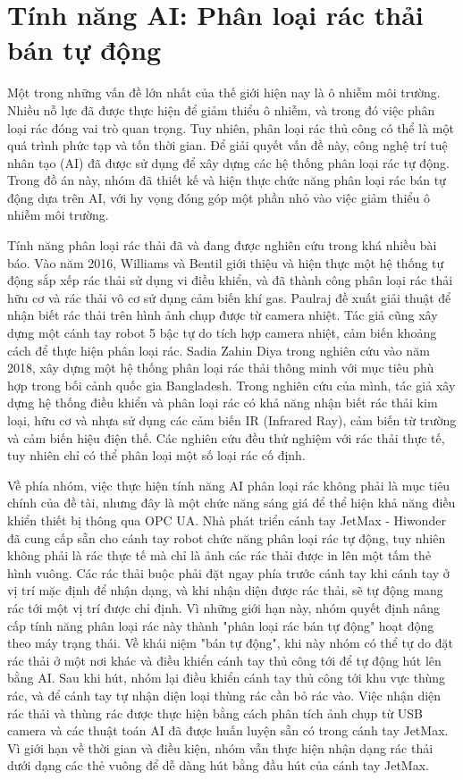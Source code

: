 \newpage

\section{Tính năng AI: Phân loại rác thải bán tự động}

Một trong những vấn đề lớn nhất của thế giới hiện nay là ô nhiễm môi trường. Nhiều nỗ lực đã được thực hiện để giảm thiểu ô nhiễm, và trong đó việc phân loại rác đóng vai trò quan trọng. Tuy nhiên, phân loại rác thủ công có thể là một quá trình phức tạp và tốn thời gian. Để giải quyết vấn đề này, công nghệ trí tuệ nhân tạo (AI) đã được sử dụng để xây dựng các hệ thống phân loại rác tự động. Trong đồ án này, nhóm đã thiết kế và hiện thực chức năng phân loại rác bán tự động dựa trên AI, với hy vọng đóng góp một phần nhỏ vào việc giảm thiểu ô nhiễm môi trường.

Tính năng phân loại rác thải đã và đang được nghiên cứu trong khá nhiều bài báo. Vào năm 2016, Williams và Bentil \cite{williams2016design} giới thiệu và hiện thực một hệ thống tự động sắp xếp rác thải sử dụng vi điều khiển, và đã thành công phân loại rác thải hữu cơ và rác thải vô cơ sử dụng cảm biến khí gas. Paulraj \cite{gundupalli2016automated} đề xuất giải thuật để nhận biết rác thải trên hình ảnh chụp được từ camera nhiệt. Tác giả cũng xây dựng một cánh tay robot 5 bậc tự do tích hợp camera nhiệt, cảm biến khoảng cách để thực hiện phân loại rác. Sadia Zahin Diya \cite{diya2018developing} trong nghiên cứu vào năm 2018, xây dựng một hệ thống phân loại rác thải thông minh với mục tiêu phù hợp trong bối cảnh quốc gia Bangladesh. Trong nghiên cứu của mình, tác giả xây dựng hệ thống điều khiển và phân loại rác có khả năng nhận biết rác thải kim loại, hữu cơ và nhựa sử dụng các cảm biến IR (Infrared Ray), cảm biến từ trường và cảm biến hiệu điện thế. Các nghiên cứu đều thử nghiệm với rác thải thực tế, tuy nhiên chỉ có thể phân loại một số loại rác cố định.


Về phía nhóm, việc thực hiện tính năng AI phân loại rác không phải là mục tiêu chính của đề tài, nhưng đây là một chức năng sáng giá để thể hiện khả năng điều khiển thiết bị thông qua OPC UA. Nhà phát triển cánh tay JetMax - Hiwonder đã cung cấp sẵn cho cánh tay robot chức năng phân loại rác tự động, tuy nhiên không phải là rác thực tế mà chỉ là ảnh các rác thải được in lên một tấm thẻ hình vuông. Các rác thải buộc phải đặt ngay phía trước cánh tay khi cánh tay ở vị trí mặc định để nhận dạng, và khi nhận diện được rác thải, sẽ tự động mang rác tới một vị trí được chỉ định. Vì những giới hạn này, nhóm quyết định nâng cấp tính năng phân loại rác này thành "phân loại rác bán tự động" hoạt động theo máy trạng thái. Về khái niệm "bán tự động", khi này nhóm có thể tự do đặt rác thải ở một nơi khác và điều khiển cánh tay thủ công tới để tự động hút lên bằng AI. Sau khi hút, nhóm lại điều khiển cánh tay thủ công tới khu vực thùng rác, và để cánh tay tự nhận diện loại thùng rác cần bỏ rác vào. Việc nhận diện rác thải và thùng rác được thực hiện bằng cách phân tích ảnh chụp từ USB camera và các thuật toán AI đã được huấn luyện sẵn có trong cánh tay JetMax. Vì giới hạn về thời gian và điều kiện, nhóm vẫn thực hiện nhận dạng rác thải dưới dạng các thẻ vuông để dễ dàng hút bằng đầu hút của cánh tay JetMax.

